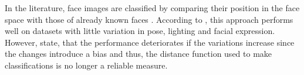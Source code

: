 In the literature, face images are classified by comparing their position in the face space with those of already known faces \cite{eigenfaces1991}.
According to \cite{eigenfaces1991}, this approach performs well on datasets with little variation in pose, lighting and facial expression.
However,  state, that the performance deteriorates if the variations increase since the changes introduce a bias 
and thus, the distance function used to make classifications is no longer a reliable measure.